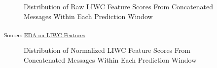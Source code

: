 \documentclass[
  letterpaper,
  DIV=11,
  numbers=noendperiod]{scrartcl}
\begin{document}
\begin{figure}[H]


\caption{\label{fig-liwc_cat_raw}Distribution of Raw LIWC Feature Scores
From Concatenated Messages Within Each Prediction Window}

\end{figure}%

\textsubscript{Source:
\href{https://jjcurtin.github.io/study_messages/notebooks/fig_eda_liwc-preview.html\#cell-fig-liwc_cat_raw}{EDA
on LIWC Features}}

\begin{figure}[H]


\caption{\label{fig-liwc_cat_norm}Distribution of Normalized LIWC
Feature Scores From Concatenated Messages Within Each Prediction Window}

\end{figure}%
\end{document}

